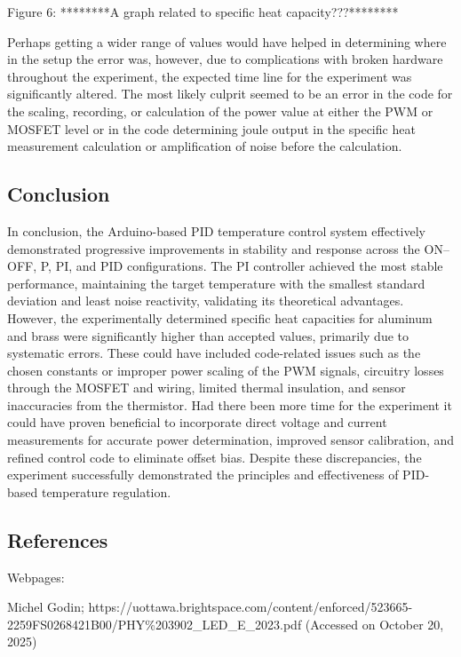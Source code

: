 \documentclass[11pt]{article}
\makeatletter
\newcommand{\boxspacing}{\kern\kvtcb@left@rule\kern\kvtcb@boxsep}
\newcommand{\prompt}[4]{
        {\ttfamily\llap{{\color{#2}[#3]:\hspace{3pt}#4}}\vspace{-\baselineskip}}
    }
\makeatother
\begin{document}
    Figure 6: ********A graph related to specific heat capacity???********

    Perhaps getting a wider range of values would have helped in determining
where in the setup the error was, however, due to complications with
broken hardware throughout the experiment, the expected time line for
the experiment was significantly altered. The most likely culprit seemed
to be an error in the code for the scaling, recording, or calculation of
the power value at either the PWM or MOSFET level or in the code
determining joule output in the specific heat measurement calculation or
amplification of noise before the calculation.

    \hypertarget{conclusion}{%
\subsection{Conclusion}\label{conclusion}}

    In conclusion, the Arduino-based PID temperature control system
effectively demonstrated progressive improvements in stability and
response across the ON--OFF, P, PI, and PID configurations. The PI
controller achieved the most stable performance, maintaining the target
temperature with the smallest standard deviation and least noise
reactivity, validating its theoretical advantages. However, the
experimentally determined specific heat capacities for aluminum and
brass were significantly higher than accepted values, primarily due to
systematic errors. These could have included code-related issues such as
the chosen constants or improper power scaling of the PWM signals,
circuitry losses through the MOSFET and wiring, limited thermal
insulation, and sensor inaccuracies from the thermistor. Had there been
more time for the experiment it could have proven beneficial to
incorporate direct voltage and current measurements for accurate power
determination, improved sensor calibration, and refined control code to
eliminate offset bias. Despite these discrepancies, the experiment
successfully demonstrated the principles and effectiveness of PID-based
temperature regulation.

    \hypertarget{references}{%
\subsection{References}\label{references}}

    Webpages:

Michel Godin;
https://uottawa.brightspace.com/content/enforced/523665-2259FS0268421B00/PHY\%203902\_LED\_E\_2023.pdf
(Accessed on October 20, 2025)

    \begin{tcolorbox}[breakable, size=fbox, boxrule=1pt, pad at break*=1mm,colback=cellbackground, colframe=cellborder]
\prompt{In}{incolor}{ }{\boxspacing}
\begin{Verbatim}[commandchars=\\\{\}]

\end{Verbatim}
\end{tcolorbox}


    
    
    
\end{document}
